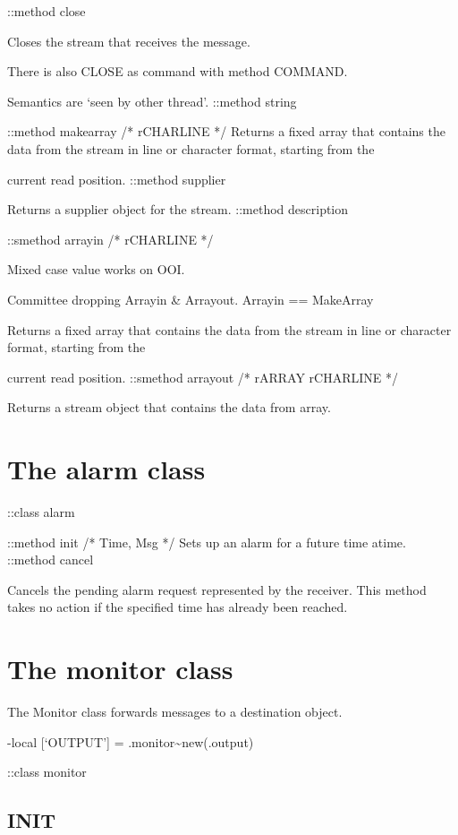 ::method close

Closes the stream that receives the message.

There is also CLOSE as command with method COMMAND.

Semantics are `seen by other thread'. ::method string

::method makearray /* rCHARLINE */ Returns a fixed array that contains
the data from the stream in line or character format, starting from the

current read position. ::method supplier

Returns a supplier object for the stream. ::method description

::smethod arrayin /* rCHARLINE */

Mixed case value works on OOI.

Committee dropping Arrayin \& Arrayout. Arrayin == MakeArray

Returns a fixed array that contains the data from the stream in line or
character format, starting from the

current read position. ::smethod arrayout /* rARRAY rCHARLINE */

Returns a stream object that contains the data from array.

\hypertarget{the-alarm-class}{%
\section{The alarm class}\label{the-alarm-class}}

::class alarm

::method init /* Time, Msg */ Sets up an alarm for a future time atime.
::method cancel

Cancels the pending alarm request represented by the receiver. This
method takes no action if the specified time has already been reached.

\hypertarget{the-monitor-class}{%
\section{The monitor class}\label{the-monitor-class}}

The Monitor class forwards messages to a destination object.

-local {[}`OUTPUT'{]} = .monitor\textasciitilde new(.output)

::class monitor

\hypertarget{init-1}{%
\subsection{INIT}\label{init-1}}

